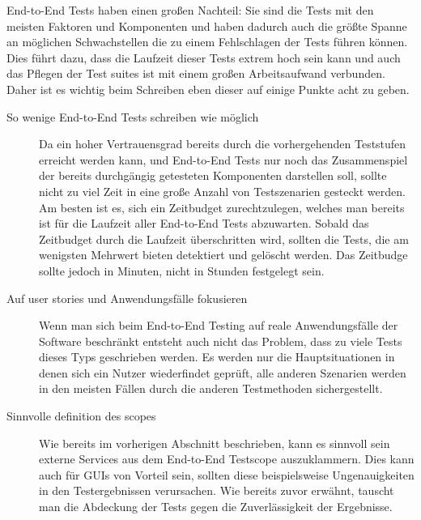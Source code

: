\documentclass[12pt,a4paper,bibliography=totocnumbered,listof=totocnumbered]{scrartcl}
\begin{document}
End-to-End Tests haben einen großen Nachteil: Sie sind die Tests mit den meisten Faktoren und Komponenten und haben dadurch auch die größte Spanne an möglichen Schwachstellen die zu einem Fehlschlagen der Tests führen können. Dies führt dazu, dass die Laufzeit dieser Tests extrem hoch sein kann und auch das Pflegen der Test suites ist mit einem großen Arbeitsaufwand verbunden.\cite{clemson} Daher ist es wichtig beim Schreiben eben dieser auf einige Punkte acht zu geben.

\begin{description}
	\item[So wenige End-to-End Tests schreiben wie möglich] Da ein hoher Vertrauensgrad bereits durch die vorhergehenden Teststufen erreicht werden kann, und End-to-End Tests nur noch das Zusammenspiel der bereits durchgängig getesteten Komponenten darstellen soll, sollte nicht zu viel Zeit in eine große Anzahl von Testszenarien gesteckt werden. Am besten ist es, sich ein Zeitbudget zurechtzulegen, welches man bereits ist für die Laufzeit aller End-to-End Tests abzuwarten. Sobald das Zeitbudget durch die Laufzeit überschritten wird, sollten die Tests, die am wenigsten Mehrwert bieten detektiert und gelöscht werden. Das Zeitbudge sollte jedoch in Minuten, nicht in Stunden festgelegt sein.\cite{clemson}	
	
	\item[Auf user stories und Anwendungsfälle fokusieren] Wenn man sich beim End-to-End Testing auf reale Anwendungsfälle der Software beschränkt entsteht auch nicht das Problem, dass zu viele Tests dieses Typs geschrieben werden. Es werden nur die Hauptsituationen in denen sich ein Nutzer wiederfindet geprüft, alle anderen Szenarien werden in den meisten Fällen durch die anderen Testmethoden sichergestellt.\cite{clemson}
	
	\item[Sinnvolle definition des scopes] Wie bereits im vorherigen Abschnitt beschrieben, kann es sinnvoll sein externe Services aus dem End-to-End Testscope auszuklammern. Dies kann auch für \acsp{GUI} von Vorteil sein, sollten diese beispielsweise Ungenauigkeiten in den Testergebnissen verursachen. Wie bereits zuvor erwähnt, tauscht man die Abdeckung der Tests gegen die Zuverlässigkeit der Ergebnisse.\cite{clemson}
	

\end{description}
\end{document}
